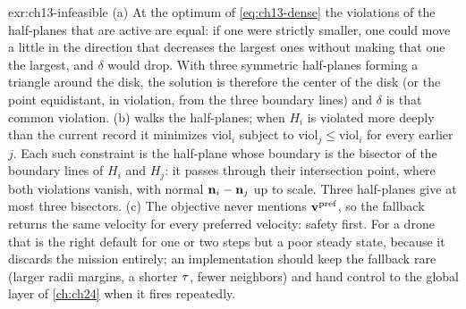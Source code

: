 \begin{solution}{exr:ch13-infeasible}
(a) At the optimum of \cref{eq:ch13-dense} the violations of the half-planes that are active are equal: if one were strictly smaller, one could move a little in the direction that decreases the largest ones without making that one the largest, and $\delta$ would drop. With three symmetric half-planes forming a triangle around the disk, the solution is therefore the center of the disk (or the point equidistant, in violation, from the three boundary lines) and $\delta$ is that common violation.
(b)  walks the half-planes; when $H_i$ is violated more deeply than the current record it minimizes $\mathrm{viol}_i$ subject to $\mathrm{viol}_j \le \mathrm{viol}_i$ for every earlier $j$. Each such constraint is the half-plane whose boundary is the bisector of the boundary lines of $H_i$ and $H_j$: it passes through their intersection point, where both violations vanish, with normal $\mathbf{n}_i - \mathbf{n}_j$ up to scale. Three half-planes give at most three bisectors.
(c) The objective never mentions $\mathbf{v}^{\mathrm{pref}}$, so the fallback returns the same velocity for every preferred velocity: safety first. For a drone that is the right default for one or two steps but a poor steady state, because it discards the mission entirely; an implementation should keep the fallback rare (larger radii margins, a shorter $\tau$, fewer neighbors) and hand control to the global layer of \cref{ch:ch24} when it fires repeatedly.
\end{solution}


